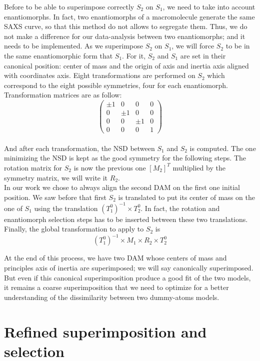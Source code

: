 \documentclass[a4paper, 11pt]{report}
\begin{document}
Before to be able to superimpose correctly $S_{2}$ on $S_{1}$, we need 
to take into account enantiomorphs. 
In fact, two enantiomorphs of a macromolecule generate the same SAXS 
curve, so that this method do not allows to segregate them. 
Thus, we do not make a difference for our data-analysis between two 
enantiomorphs; and it needs to be implemented. 
As we superimpose $S_{2}$ on $S_{1}$, we will force $S_{2}$ to be in 
the same enantiomorphic form that $S_{1}$. 
For it, $S_{2}$ and $S_{1}$ are set in their canonical position: 
center of mass and the origin of axis and inertia axis aligned with 
coordinates axis. 
Eight transformations are performed on $S_{2}$ which correspond to the 
eight possible symmetries, four for each enantiomorph. 
Transformation matrices are as follow:
\[
\begin{pmatrix}
 \pm 1 & 0 & 0 & 0 \\
 0 & \pm 1 & 0 & 0 \\
 0 & 0 & \pm 1 & 0 \\
 0 & 0 & 0 & 1
\end{pmatrix}
\]\\
And after each transformation, the NSD between $S_{1}$ and $S_{2}$ is 
computed. 
The one minimizing the NSD is kept as the good symmetry for the 
following steps. 
The rotation matrix for $S_{2}$ is now the previous one $[M_{2}]^T$ 
multiplied by the symmetry matrix, we will write it $R_{2}$.\\

In our work we chose to always align the second DAM on the first one 
initial position. 
We saw before that first $S_{2}$ is translated to put its center of 
mass on the one of $S_{1}$ using the translation 
$(T_{1}^0)^{-1} \times T_{2}^0$. 
In fact, the rotation and enantiomorph selection steps has to be 
inserted between these two translations. 
Finally, the global transformation to apply to $S_{2}$ is 
\[(T_{1}^0)^{-1} \times M_{1} \times R_{2} \times T_{2}^0\]

At the end of this process, we have two DAM whose centers of mass and 
principles axis of inertia are superimposed; we will say canonically 
superimposed. 
But even if this canonical superimposition produce a good fit of the 
two models, it remains a coarse superimposition that we need to 
optimize for a better understanding of the dissimilarity between two 
dummy-atoms models.

\section{Refined superimposition and selection}
\end{document}
